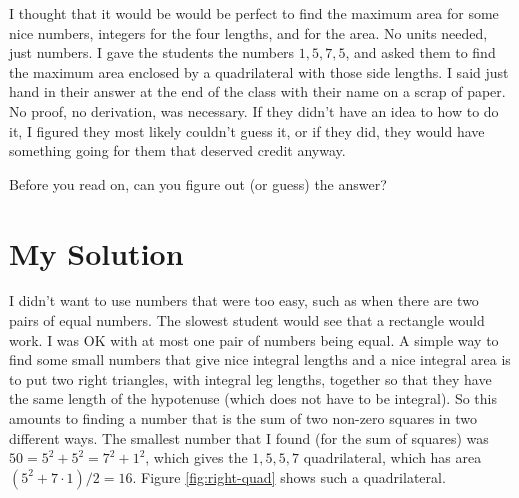 \documentclass[11pt]{article}
\numberwithin{equation}{section}
\numberwithin{figure}{section}
\begin{document}
I thought that it would be  would be perfect to find the maximum area for some nice numbers, integers for the four lengths, and for the area.  No units needed, just numbers.  I gave the students the numbers $1, 5, 7, 5$, and asked them to find the maximum area enclosed by a quadrilateral with those side lengths.   I said just hand in their answer at the end of the class with their name on a scrap of paper.  No proof, no derivation, was necessary.  If they didn't have an idea to how to do it, I figured they most likely couldn't guess it, or if they did, they would have something going for them that deserved credit anyway.

Before you read on, can you figure out (or guess) the answer?



\section{My Solution} \label{section:square-sums}

I didn't want to use numbers that were too easy, such as when there are two pairs of equal numbers.  The slowest student would see that a rectangle would work.  I was OK with at most one pair of numbers being equal.  A simple way to find some small numbers that give nice  integral lengths and a nice integral area is to put two right triangles, with integral leg lengths, together so that they have the same  length of the hypotenuse (which does not have to be integral).  So this amounts to finding a number that is the sum of two non-zero squares in two different ways.  The smallest number that I found (for the sum of squares) was $50 =5^2 + 5^2=7^2 +1^2$, which gives the  $1, 5, 5, 7$ quadrilateral, which has area $(5^2 +7\cdot 1)/2=16$.  Figure \ref{fig:right-quad} shows such a quadrilateral.
\end{document}
